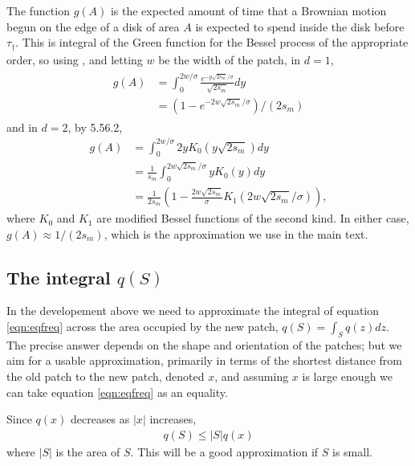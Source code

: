 \documentclass{article}
\newcommand{\citet}[1]{\cite{#1}}
\newcommand{\E}{\mathbb{E}}
\newcommand{\one}{\mathbf{1}}
\begin{document}
The function $g(A)$ is the expected amount of time that a Brownian motion begun on the edge of a disk of area $A$
is expected to spend inside the disk before $\tau_\dagger$.
This is integral of the Green function for the Bessel process of the appropriate order, 
so using \citet{borodin2002handbook}, %
and letting $w$ be the width of the patch,
in $d=1$,
\begin{align} \label{eqn:gA_1D}
  \begin{split}
    g(A) %
      &= \int_0^{2w/\sigma} \frac{ e^{- y \sqrt{2s_m}/\sigma }}{\sqrt{2s_m}} dy \\
      &= (1-e^{-2w\sqrt{2s_m}/\sigma})/(2s_m)
  \end{split}
\end{align}
and in $d=2$, by \citet{gradshteyn2007table} 5.56.2,
\begin{align}
    g(A) %
  &= \int_0^{2w/\sigma} 2 y K_0(y \sqrt{2s_m}) dy \\
  &= \frac{1}{s_m}\int_0^{2w\sqrt{2s_m}/\sigma} y K_0(y) dy \\
  &= \frac{1}{2s_m}\left(1- \frac{2w\sqrt{2s_m}}{\sigma} K_1(2w\sqrt{2s_m}/\sigma) \right)  ,
\end{align}
where $K_0$ and $K_1$ are modified Bessel functions of the second kind.
In either case, $g(A) \approx 1/(2s_m)$, which is the approximation we use in the main text.


\subsection[The Integral $q(S)$]{The integral $q(S)$}
\label{apx:qS}

In the developement above
we need to approximate the integral of equation \eqref{eqn:eqfreq}
across the area occupied by the new patch,
$q(S) = \int_S q(z) dz$.
The precise answer depends on the shape and orientation of the patches;
but we aim for a usable approximation,
primarily in terms of the shortest distance from the old patch to the new patch, denoted $x$,
and assuming $x$ is large enough we can take equation \eqref{eqn:eqfreq} as an equality.

Since $q(x)$ decreases as $|x|$ increases,
\begin{align}
    q(S) \le |S| q(x) %
\end{align}
where $|S|$ is the area of $S$.
This will be a good approximation if $S$ is small.
\end{document}

